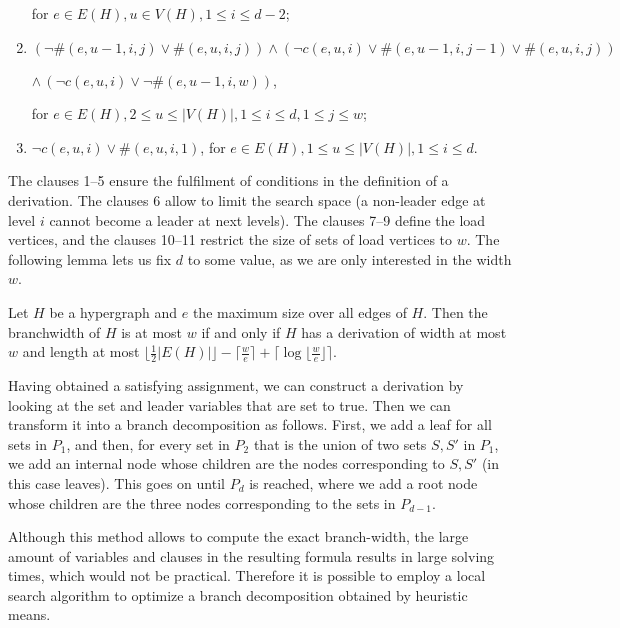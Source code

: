 \begin{enumerate}
	for $e \in E(H), u \in V(H), 1 \leq i \leq d-2$;
	
	\item $(\neg \#(e,u-1,i,j) \lor \#(e,u,i,j)) \land (\neg c(e,u,i) \lor \#(e,u-1,i,j-1) \lor \#(e,u,i,j))$\vspace{-4pt}
	
	$\land \, (\neg c(e,u,i) \lor \neg \#(e,u-1,i,w))$,
	
	for $e \in E(H), 2 \leq u \leq |V(H)|, 1 \leq i \leq d, 1 \leq j \leq w$;
	
	\item $\neg c(e,u,i) \lor \#(e,u,i,1)$, for $e \in E(H), 1 \leq u \leq |V(H)|, 1 \leq i \leq d$.
\end{enumerate}

\noindent
The clauses 1--5 ensure the fulfilment of conditions in the definition of a derivation.
The clauses 6 allow to limit the search space (a non-leader edge at level $i$ cannot become a leader at next levels).
The clauses 7--9 define the load vertices, and the clauses 10--11 restrict the size of sets of load vertices to $w$.
The following lemma lets us fix $d$ to some value, as we are only interested in the width $w$.

\begin{lemma}
	Let $H$ be a hypergraph and $e$ the maximum size over all edges of $H$.
	Then the branchwidth of $H$ is at most $w$ if and only if $H$ has a derivation of width at most $w$ and length at most $\lfloor \frac{1}{2} |E(H)| \rfloor - \lceil \frac{w}{e} \rceil + \lceil \log \lfloor \frac{w}{e} \rfloor \rceil$.
\end{lemma}

\noindent
Having obtained a satisfying assignment, we can construct a derivation by looking at the set and leader variables that are set to true.
Then we can transform it into a branch decomposition as follows.
First, we add a leaf for all sets in $P_1$, and then, for every set in $P_2$ that is the union of two sets $S,S'$ in $P_1$, we add an internal node whose children are the nodes corresponding to $S,S'$ (in this case leaves).
This goes on until $P_d$ is reached, where we add a root node whose children are the three nodes corresponding to the sets in $P_{d-1}$.

Although this method allows to compute the exact branch-width, the large amount of variables and clauses in the resulting formula results in large solving times, which would not be practical.
Therefore it is possible to employ a local search algorithm to optimize a branch decomposition obtained by heuristic means.

